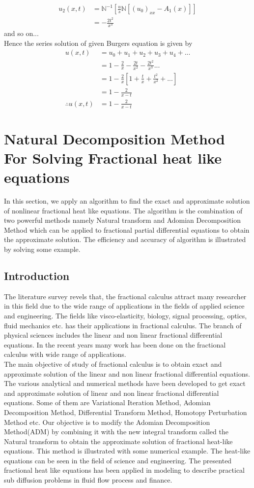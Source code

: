 \begin{align*}
u_{2}(x,t)&=\mathbb{N}^{-1}[\frac{u}{s}\mathbb{N}[(u_{0})_{xx}- A_{1}(x)]]\\
&=-\frac{2t^2}{x^3}
\end{align*}
and so on...\\
Hence the series solution of given Burgers equation is given by
\begin{align*}
u(x,t)&= u_{0}+u_{1}+u_{2}+u_{3}+u_{4}+...\\
&= 1-\frac{2}{x}-\frac{2t}{x^2}-\frac{2t^2}{x^3}...\\
&=1-\frac{2}{x}[1+\frac{t}{x}+\frac{t^2}{x^2}+...]\\
&=1-\frac{2}{x-t}\\
\therefore u(x,t)&=1-\frac{2}{x-t}
\end{align*}
\newpage
{}
\section{Natural Decomposition Method For Solving Fractional heat like equations}
In this section, we apply an algorithm to find the exact and approximate solution of nonlinear fractional heat like equations. The algorithm is the combination of two powerful methods namely Natural transform and Adomian Decomposition Method which can be applied to fractional partial differential equations to obtain the approximate solution. The efficiency and accuracy of algorithm is illustrated by solving some example.
\subsection{Introduction}
The literature survey revels that, the fractional calculus attract many researcher in this field due to the wide range of applications in the fields of applied science and engineering. The fields like visco-elasticity, biology, signal processing, optics, fluid mechanics etc. has their applications in fractional calculus. The branch of physical sciences includes the linear and non linear fractional differential equations. In the recent years many work has been done on the fractional calculus with wide range of applications.\\
The main objective of study of fractional calculus is to obtain exact and approximate solution of the linear and non linear fractional differential equations. The various analytical and numerical methods have been developed to get exact and approximate solution of linear and non linear fractional differential equations. Some of them are Variational Iteration Method, Adomian Decomposition Method, Differential Transform Method, Homotopy Perturbation Method etc. Our objective is to modify the Adomian Decomposition Method(ADM) by combining it with the new integral transform called the Natural transform to obtain the approximate solution of fractional heat-like equations. This method is illustrated with some numerical example. The heat-like equations can be seen in the field of science and engineering. The presented fractional heat like equations has been applied in modeling to describe practical sub diffusion problems in fluid flow process and finance.

